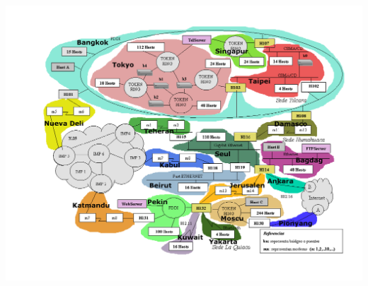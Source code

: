 \documentclass[12pt,titlepage]{article}
\begin{document}
\begin{center}
\includegraphics[trim = 45mm 50mm 40mm 45mm, clip,height=0.7\textheight,width=1.3\textwidth, angle=90]{Subneting.png}
\end{center}
\end{document}
